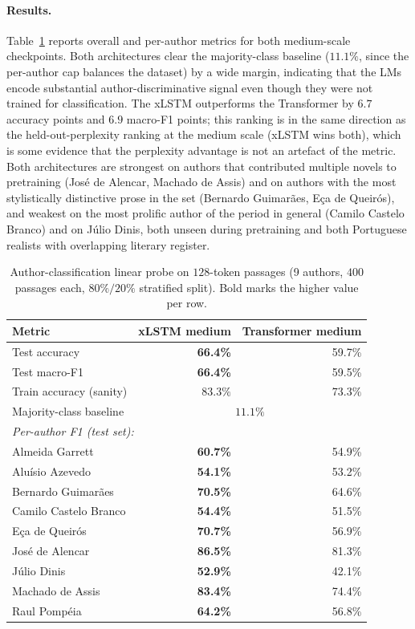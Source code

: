 \documentclass[11pt]{article}
\begin{document}
\paragraph{Results.}
Table~\ref{tab:probe} reports overall and per-author metrics for both
medium-scale checkpoints. Both architectures clear the
majority-class baseline ($11.1\%$, since the per-author cap balances
the dataset) by a wide margin, indicating that the LMs encode
substantial author-discriminative signal even though they were not
trained for classification. The xLSTM outperforms the Transformer by
$6.7$ accuracy points and $6.9$ macro-F1 points; this ranking is in the
same direction as the held-out-perplexity ranking at the medium scale
(xLSTM wins both), which is some evidence that the perplexity advantage
is not an artefact of the metric. Both architectures are strongest on
authors that contributed multiple novels to pretraining (José de
Alencar, Machado de Assis) and on authors with the most stylistically
distinctive prose in the set (Bernardo Guimarães, Eça de Queirós), and
weakest on the most prolific author of the period in general (Camilo
Castelo Branco) and on Júlio Dinis, both unseen during pretraining and
both Portuguese realists with overlapping literary register.

\begin{table}[h]
\centering
\caption{Author-classification linear probe on $128$-token passages
  (9 authors, $400$ passages each, $80\%/20\%$ stratified split).
  Bold marks the higher value per row.}
\label{tab:probe}
\small
\setlength{\tabcolsep}{6pt}
\begin{tabular}{lrr}
\toprule
Metric & xLSTM medium & Transformer medium \\
\midrule
Test accuracy             & \textbf{66.4\%} & 59.7\% \\
Test macro-F1             & \textbf{66.4\%} & 59.5\% \\
Train accuracy (sanity)   & $83.3\%$        & $73.3\%$ \\
Majority-class baseline   & \multicolumn{2}{c}{$11.1\%$} \\
\midrule
\multicolumn{3}{l}{\emph{Per-author F1 (test set):}} \\
Almeida Garrett           & \textbf{60.7\%} & 54.9\% \\
Aluísio Azevedo           & \textbf{54.1\%} & 53.2\% \\
Bernardo Guimarães        & \textbf{70.5\%} & 64.6\% \\
Camilo Castelo Branco     & \textbf{54.4\%} & 51.5\% \\
Eça de Queirós            & \textbf{70.7\%} & 56.9\% \\
José de Alencar           & \textbf{86.5\%} & 81.3\% \\
Júlio Dinis               & \textbf{52.9\%} & 42.1\% \\
Machado de Assis          & \textbf{83.4\%} & 74.4\% \\
Raul Pompéia              & \textbf{64.2\%} & 56.8\% \\
\bottomrule
\end{tabular}
\end{table}
\end{document}
